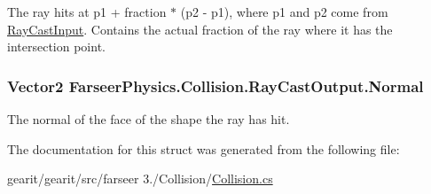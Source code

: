 The ray hits at p1 + fraction $\ast$ (p2 -\/ p1), where p1 and p2 come from \hyperlink{struct_farseer_physics_1_1_collision_1_1_ray_cast_input}{Ray\+Cast\+Input}. Contains the actual fraction of the ray where it has the intersection point. 

\hypertarget{struct_farseer_physics_1_1_collision_1_1_ray_cast_output_a1a742e82430b2986b60ae8ce4f466419}{
\subsubsection[{Normal}]{\setlength{\rightskip}{0pt plus 5cm}Vector2 Farseer\+Physics.\+Collision.\+Ray\+Cast\+Output.\+Normal}}\label{struct_farseer_physics_1_1_collision_1_1_ray_cast_output_a1a742e82430b2986b60ae8ce4f466419}


The normal of the face of the shape the ray has hit. 



The documentation for this struct was generated from the following file\+:\begin{DoxyCompactItemize}
\item 
gearit/gearit/src/farseer 3./\+Collision/\hyperlink{_collision_8cs}{Collision.\+cs}\end{DoxyCompactItemize}
